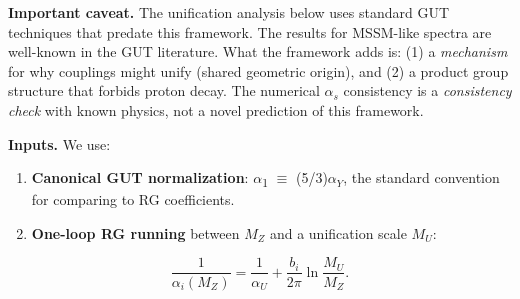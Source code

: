 \documentclass[11pt,a4paper]{article}
\theoremstyle{remark}
\begin{document}
\textbf{Important caveat.} The unification analysis below uses standard GUT
techniques that predate this framework. The results for MSSM-like spectra
are well-known in the GUT literature. What the framework adds is:
(1) a \emph{mechanism} for why couplings might unify (shared geometric origin),
and (2) a product group structure that forbids proton decay. The numerical
\(\ensuremath{\alpha}_s\) consistency is a \emph{consistency check} with known physics, not a
novel prediction of this framework.

\textbf{Inputs.} We use:

\begin{enumerate}
\def\labelenumi{\arabic{enumi}.}
\item
  \textbf{Canonical GUT normalization}: \ensuremath{\alpha}\textsubscript{1} \ensuremath{\equiv} (5/3)\(\ensuremath{\alpha}_Y\), the
  standard convention for comparing to RG coefficients.
\item
  \textbf{One-loop RG running} between \(M_Z\) and a unification scale \(M_U\):
\end{enumerate}

\[
   \frac{1}{\alpha_i(M_Z)} = \frac{1}{\alpha_U} + \frac{b_i}{2\pi}
   \ln\frac{M_U}{M_Z}.
\]
\end{document}
